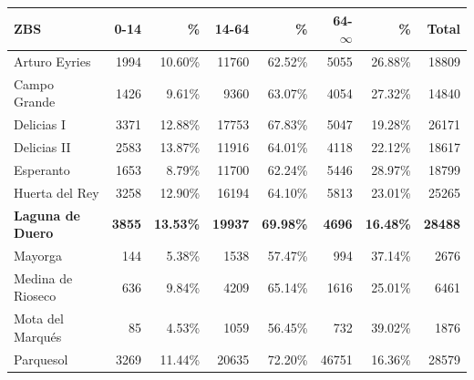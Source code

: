 \begin{table}[H]
    \centering
    \begin{tabular}{lrrrrrrr}
        \toprule
        ZBS                      & 0-14           & \%               & 14-64           & \%               & 64-$\infty$    & \%               & Total            \\
        \midrule
        Arturo Eyries            & 1994           & 10.60\%          & 11760           & 62.52\%          & 5055           & 26.88\%          & 18809            \\
        Campo Grande             & 1426           & 9.61\%           & 9360            & 63.07\%          & 4054           & 27.32\%          & 14840            \\
        Delicias I               & 3371           & 12.88\%          & 17753           & 67.83\%          & 5047           & 19.28\%          & 26171            \\
        Delicias II              & 2583           & 13.87\%          & 11916           & 64.01\%          & 4118           & 22.12\%          & 18617            \\
        Esperanto                & 1653           & 8.79\%           & 11700           & 62.24\%          & 5446           & 28.97\%          & 18799            \\
        Huerta del Rey           & 3258           & 12.90\%          & 16194           & 64.10\%          & 5813           & 23.01\%          & 25265            \\
        \textbf{Laguna de Duero} & \textbf{3855}  & \textbf{13.53\%} & \textbf{19937}  & \textbf{69.98\%} & \textbf{4696}  & \textbf{16.48\%} & \textbf{28488}   \\
        Mayorga                  & 144            & 5.38\%           & 1538            & 57.47\%          & 994            & 37.14\%          & 2676             \\
        Medina de Rioseco        & 636            & 9.84\%           & 4209            & 65.14\%          & 1616           & 25.01\%          & 6461             \\
        Mota del Marqués         & 85             & 4.53\%           & 1059            & 56.45\%          & 732            & 39.02\%          & 1876             \\
        Parquesol                & 3269           & 11.44\%          & 20635           & 72.20\%          & 46751       & 16.36\%          & 28579            \\

\end{tabular}
\end{table}
